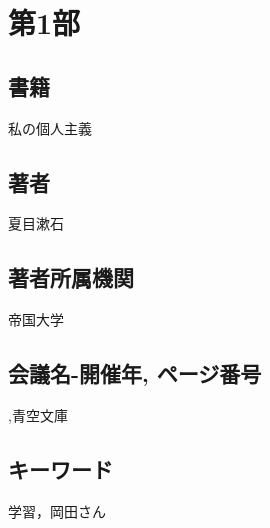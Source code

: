 \documentclass[../main]{subfiles}
\begin{document}
\section*{第1部}
\label{第1部}
  \subsection*{書籍}
  \noindent
  私の個人主義
  \subsection*{著者}
  夏目漱石
  \subsection*{著者所属機関}
  帝国大学
  \subsection*{会議名-開催年, ページ番号}
  ,青空文庫
  \subsection*{キーワード}
  学習，岡田さん
\end{document}
